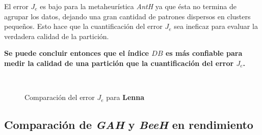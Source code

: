     El error $J_e$ es bajo para la metaheurística \emph{AntH} ya que ésta no
termina de agrupar los datos, dejando una gran cantidad de patrones dispersos en
clusters pequeños. Esto hace que la cuantificación del error $J_e$ sea ineficaz
para evaluar la verdadera calidad de la partición.

    \textbf{Se puede concluir entonces que el índice $DB$ es más confiable para
medir la calidad de una partición que la cuantificación del error $J_e$.}

\begin{figure}[h!]
  \centering
  \\
  \caption{Comparación del error $J_e$ para \textbf{Lenna}}
  \label{fig:alg_comp_lenna_je}
\end{figure}

\subsection{Comparación de \emph{GAH} y \emph{BeeH} en rendimiento}

